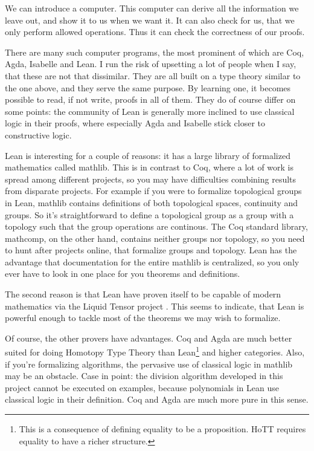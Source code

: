 \documentclass[a4paper, 12pt]{article}
\theoremstyle{changedot}
\theoremstyle{changedotbreak}
\theoremstyle{nonumberplain}
\begin{document}
We can introduce a computer. This computer can derive all the information we leave out, and show it to us when we want it. It can also check for us, that we only perform allowed operations. Thus it can check the correctness of our proofs.

There are many such computer programs, the most prominent of which are Coq, Agda, Isabelle and Lean. I run the risk of upsetting a lot of people when I say, that these are not that dissimilar. They are all built on a type theory similar to the one above, and they serve the same purpose. By learning one, it becomes possible to read, if not write, proofs in all of them. They do of course differ on some points: the community of Lean is generally more inclined to use classical logic in their proofs, where especially Agda and Isabelle stick closer to constructive logic.

Lean is interesting for a couple of reasons: it has a large library of formalized mathematics called mathlib. This is in contrast to Coq, where a lot of work is spread among different projects, so you may have difficulties combining results from disparate projects. For example if you were to formalize topological groups in Lean, mathlib contains definitions of both topological spaces, continuity and groups. So it's straightforward to define a topological group as a group with a topology such that the group operations are continous. The Coq standard library, mathcomp, on the other hand, contains neither groups nor topology, so you need to hunt after projects online, that formalize groups and topology. Lean has the advantage that documentation for the entire mathlib is centralized, so you only ever have to look in one place for you theorems and definitions.

The second reason is that Lean have proven itself to be capable of modern mathematics via the Liquid Tensor project \cite{LiquidTensor}. This seems to indicate, that Lean is powerful enough to tackle most of the theorems we may wish to formalize.

Of course, the other provers have advantages. Coq and Agda are much better suited for doing Homotopy Type Theory than Lean\footnote{This is a consequence of defining equality to be a proposition. HoTT requires equality to have a richer structure.}  and higher categories. Also, if you're formalizing algorithms, the pervasive use of classical logic in mathlib may be an obstacle. Case in point: the division algorithm developed in this project cannot be executed on examples, because polynomials in Lean use classical logic in their definition. Coq and Agda are much more pure in this sense.
\end{document}
